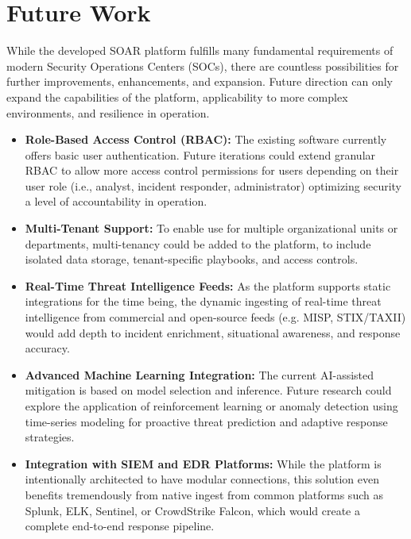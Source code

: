 \section{Future Work}

While the developed SOAR platform fulfills many fundamental requirements of modern Security Operations Centers (SOCs), there are countless possibilities for further improvements, enhancements, and expansion. Future direction can only expand the capabilities of the platform, applicability to more complex environments, and resilience in operation.

\begin{itemize}
    \item \textbf{Role-Based Access Control (RBAC):} The existing software currently offers basic user authentication. Future iterations could extend granular RBAC to allow more access control permissions for users depending on their user role (i.e., analyst, incident responder, administrator) optimizing security a level of accountability in operation.
    
    \item \textbf{Multi-Tenant Support:} To enable use for multiple organizational units or departments, multi-tenancy could be added to the platform, to include isolated data storage, tenant-specific playbooks, and access controls.

    \item \textbf{Real-Time Threat Intelligence Feeds:} As the platform supports static integrations for the time being, the dynamic ingesting of real-time threat intelligence from commercial and open-source feeds (e.g. MISP, STIX/TAXII) would add depth to incident enrichment, situational awareness, and response accuracy.

    \item \textbf{Advanced Machine Learning Integration:} The current AI-assisted mitigation is based on model selection and inference. Future research could explore the application of reinforcement learning or anomaly detection using time-series modeling for proactive threat prediction and adaptive response strategies.

    \item \textbf{Integration with SIEM and EDR Platforms:} While the platform is intentionally architected to have modular connections, this solution even benefits tremendously from native ingest from common platforms such as Splunk, ELK, Sentinel, or CrowdStrike Falcon, which would create a complete end-to-end response pipeline.


\end{itemize}
